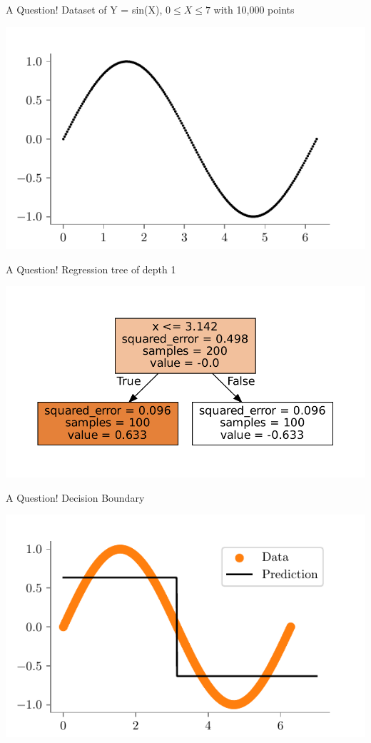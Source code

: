 \documentclass{beamer}
\begin{document}
\begin{frame}{A Question!}
Dataset of Y = sin(X), $0 \leq X \leq 7$ with 10,000 points 
\begin{center}
\includegraphics{../figures/decision-trees/sine-dataset.pdf}
\end{center}
\end{frame}

\begin{frame}{A Question!}
Regression tree of depth 1
\begin{center}
\includegraphics{../figures/decision-trees/sine-depth-1-sklearn.pdf}
\end{center}
\end{frame}

\begin{frame}{A Question!}
Decision Boundary
\begin{center}
\includegraphics[scale=0.5]{../figures/decision-trees/sine-depth-1.pdf}
\end{center}
\end{frame}
\end{document}
